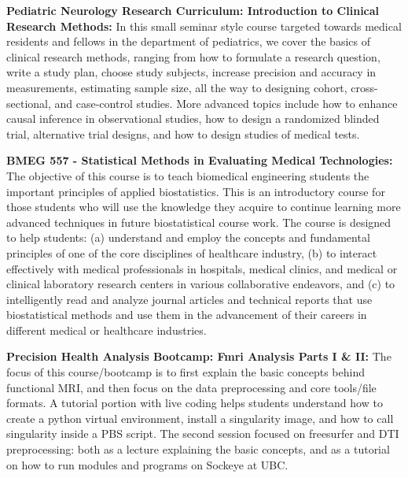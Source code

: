 \documentclass[11pt,notitlepage,english]{report}
\begin{document}
\vspace{5pt}

\textbf{Pediatric Neurology Research Curriculum: Introduction to Clinical Research Methods:} In this small seminar style course targeted towards medical residents and fellows in the department of pediatrics, we cover the basics of clinical research methods, ranging from how to formulate a research question, write a study plan, choose study subjects, increase precision and accuracy in measurements, estimating sample size, all the way to designing cohort, cross-sectional, and case-control studies. More advanced topics include how to enhance causal inference in observational studies, how to design a randomized blinded trial, alternative trial designs, and how to design studies of medical tests.

\vspace{5pt}

\textbf{BMEG 557 - Statistical Methods in Evaluating Medical Technologies:} The objective of this course is to teach biomedical engineering students the important principles of applied biostatistics. This is an introductory course for those students who will use the knowledge they acquire to continue learning more advanced techniques in future biostatistical course work. The course is designed to help students: (a) understand and employ the concepts and fundamental principles of one of the core disciplines of healthcare industry, (b) to interact effectively with medical professionals in hospitals, medical clinics, and medical or clinical laboratory research centers in various collaborative endeavors, and (c) to intelligently read and analyze journal articles and technical reports that use biostatistical methods and use them in the advancement of their careers in different medical or healthcare industries.

\vspace{5pt}

\textbf{Precision Health Analysis Bootcamp: Fmri Analysis Parts I \& II:} The focus of this course/bootcamp is to first explain the basic concepts behind functional MRI, and then focus on the data preprocessing and core tools/file formats. A tutorial portion with live coding helps students understand how to create a python virtual environment, install a singularity image, and how to call singularity inside a PBS script. The second session focused on freesurfer and DTI preprocessing: both as a lecture explaining the basic concepts, and as a tutorial on how to run modules and programs on Sockeye at UBC.
\end{document}
